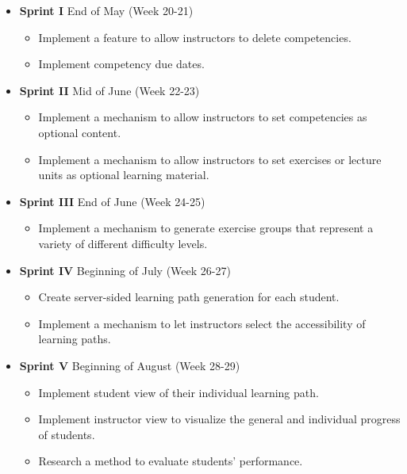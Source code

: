 \documentclass[a4paper,12pt,twoside]{article}
\begin{document}
\begin{itemize}
        \item \textbf{Sprint I} End of May (Week 20-21)
              \begin{itemize}
                      \item Implement a feature to allow instructors to delete competencies.
                      \item Implement competency due dates.
              \end{itemize}

        \item \textbf{Sprint II} Mid of June (Week 22-23)
              \begin{itemize}
                      \item Implement a mechanism to allow instructors to set competencies as optional content.
                      \item Implement a mechanism to allow instructors to set exercises or lecture units as optional learning material.
              \end{itemize}

        \item \textbf{Sprint III} End of June (Week 24-25)
              \begin{itemize}
                      \item Implement a mechanism to generate exercise groups that represent a variety of different difficulty levels.
              \end{itemize}

        \item \textbf{Sprint IV} Beginning of July (Week 26-27)
              \begin{itemize}
                      \item Create server-sided learning path generation for each student.
                      \item Implement a mechanism to let instructors select the accessibility of learning paths.
              \end{itemize}

        \item \textbf{Sprint V} Beginning of August (Week 28-29)
              \begin{itemize}
                      \item Implement student view of their individual learning path.
                      \item Implement instructor view to visualize the general and individual progress of students.
                      \item Research a method to evaluate students' performance.
              \end{itemize}


\end{itemize}
\end{document}
